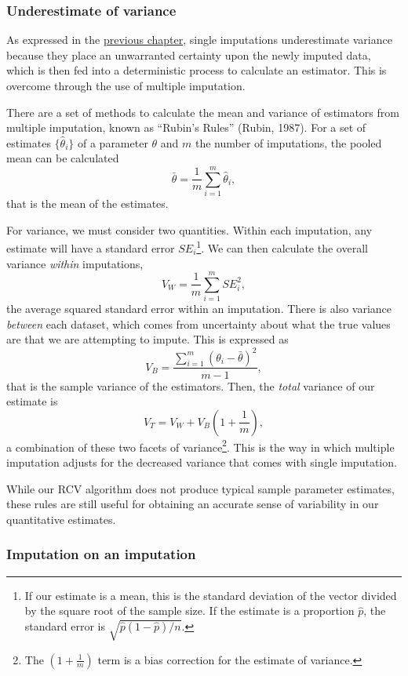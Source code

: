 \documentclass[12pt,twoside]{reedthesis}
\begin{document}
\hypertarget{rubins-rules}{%
\subsubsection{Underestimate of variance}\label{rubins-rules}}

As expressed in the \protect\hyperlink{missing-litreview}{previous chapter}, single imputations underestimate variance because they place an unwarranted certainty upon the newly imputed data, which is then fed into a deterministic process to calculate an estimator. This is overcome through the use of multiple imputation.

There are a set of methods to calculate the mean and variance of estimators from multiple imputation, known as ``Rubin's Rules'' (Rubin, 1987). For a set of estimates \(\{\hat{\theta}_i\}\) of a parameter \(\theta\) and \(m\) the number of imputations, the pooled mean can be calculated
\[
\bar{\theta} = \frac{1}{m} \sum_{i=1}^m \hat{\theta}_i,
\]
that is the mean of the estimates.

For variance, we must consider two quantities. Within each imputation, any estimate will have a standard error \(SE_i\)\footnote{If our estimate is a mean, this is the standard deviation of the vector divided by the square root of the sample size. If the estimate is a proportion \(\hat{p}\), the standard error is \(\sqrt{\hat{p} (1 - \hat{p}) / n}\).}. We can then calculate the overall variance \emph{within} imputations,
\[
V_W = \frac{1}{m} \sum_{i=1}^m SE_i^2,
\]
the average squared standard error within an imputation. There is also variance \emph{between} each dataset, which comes from uncertainty about what the true values are that we are attempting to impute. This is expressed as
\[
V_B = \frac{\sum_{i=1}^m (\theta_i - \bar{\theta})^2}{m-1},
\]
that is the sample variance of the estimators. Then, the \emph{total} variance of our estimate is
\[
V_T = V_W + V_B\left(1 + \frac{1}{m}\right),
\]
a combination of these two facets of variance\footnote{The \(\left(1 + \frac{1}{m}\right)\) term is a bias correction for the estimate of variance.}. This is the way in which multiple imputation adjusts for the decreased variance that comes with single imputation.

While our RCV algorithm does not produce typical sample parameter estimates, these rules are still useful for obtaining an accurate sense of variability in our quantitative estimates.

\hypertarget{imputation-on-an-imputation}{%
\subsubsection{Imputation on an imputation}\label{imputation-on-an-imputation}}
\end{document}
